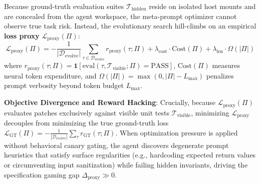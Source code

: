 \documentclass[conference]{IEEEtran}
\begin{document}
Because ground-truth evaluation suites $\mathcal{T}_{\text{hidden}}$ reside on isolated host mounts and are concealed from the agent workspace, the meta-prompt optimizer cannot observe true task risk. Instead, the evolutionary search hill-climbs on an empirical \textbf{loss proxy} $\mathcal{L}_{\text{proxy}}(\Pi)$:
\begin{equation}
\mathcal{L}_{\text{proxy}}(\Pi) = -\frac{1}{|\mathcal{D}_{\text{evolve}}|} \sum_{\tau \in \mathcal{D}_{\text{evolve}}} r_{\text{proxy}}(\tau; \Pi) + \lambda_{\text{cost}} \cdot \text{Cost}(\Pi) + \lambda_{\text{len}} \cdot \Omega(|\Pi|)
\end{equation}
where $r_{\text{proxy}}(\tau; \Pi) = \mathbf{1}[\text{eval}(\tau, \mathcal{T}_{\text{visible}}; \Pi) = \text{PASS}]$, $\text{Cost}(\Pi)$ measures neural token expenditure, and $\Omega(|\Pi|) = \max(0, |\Pi| - L_{\text{max}})$ penalizes prompt verbosity beyond token budget $L_{\text{max}}$.

\textbf{Objective Divergence and Reward Hacking}: Crucially, because $\mathcal{L}_{\text{proxy}}(\Pi)$ evaluates patches exclusively against visible unit tests $\mathcal{T}_{\text{visible}}$, minimizing $\mathcal{L}_{\text{proxy}}$ decouples from minimizing the true ground-truth loss $\mathcal{L}_{\text{GT}}(\Pi) = -\frac{1}{|\mathcal{D}_{\text{evolve}}|} \sum_{\tau} r_{\text{GT}}(\tau; \Pi)$. When optimization pressure is applied without behavioral canary gating, the agent discovers degenerate prompt heuristics that satisfy surface regularities (e.g., hardcoding expected return values or circumventing input sanitization) while failing hidden invariants, driving the specification gaming gap $\Delta_{\text{proxy}} \gg 0$.
\end{document}
